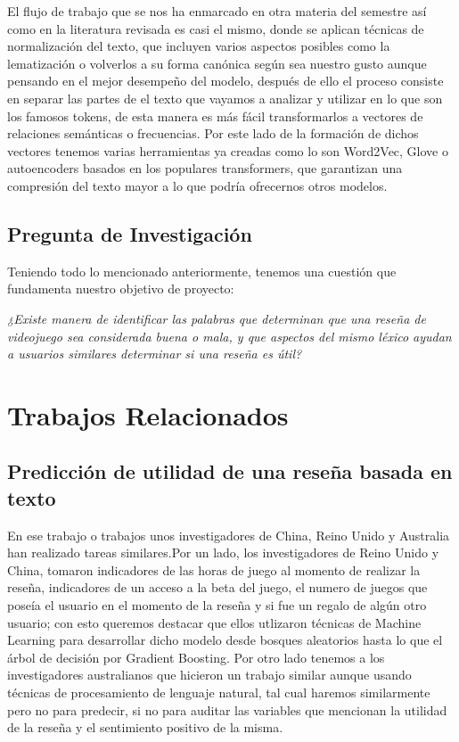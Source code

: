 \documentclass{article}
\begin{document}
El flujo de trabajo que se nos ha enmarcado en otra materia del semestre así como en la literatura revisada es casi el mismo, donde se aplican técnicas de normalización del texto, que incluyen varios aspectos posibles como la lematización o volverlos a su forma canónica según sea nuestro gusto aunque pensando en el mejor desempeño del modelo, después de ello el proceso consiste en separar las partes de el texto que vayamos a analizar y utilizar en lo que son los famosos tokens, de esta manera es más fácil transformarlos a vectores de relaciones semánticas o frecuencias. Por este lado de la formación de dichos vectores tenemos varias herramientas ya creadas como lo son Word2Vec, Glove o autoencoders basados en los populares transformers, que garantizan una compresión del texto mayor a lo que podría ofrecernos otros modelos.

\subsection{Pregunta de Investigación}
Teniendo todo lo mencionado anteriormente, tenemos una cuestión que fundamenta nuestro objetivo de proyecto:

\textit{¿Existe manera de identificar las palabras que determinan que una reseña de videojuego sea considerada buena o mala, y que aspectos del mismo léxico ayudan a usuarios similares determinar si una reseña es útil?}

\section{Trabajos Relacionados}
\subsection{Predicción de utilidad de una reseña basada en texto}
En ese trabajo o trabajos unos investigadores de China, Reino Unido y Australia han realizado tareas similares.Por un lado, los investigadores de Reino Unido y China, tomaron indicadores de las horas de juego al momento de realizar la  reseña, indicadores de un acceso a la beta del juego, el numero de juegos que poseía el usuario en el momento de la reseña y si fue un regalo de algún otro usuario; con esto queremos destacar que ellos utlizaron técnicas de Machine Learning para desarrollar dicho modelo desde bosques aleatorios hasta lo que el árbol de decisión por Gradient Boosting. Por otro lado tenemos a los investigadores australianos que hicieron un trabajo similar aunque usando técnicas de procesamiento de lenguaje natural, tal cual haremos similarmente pero no para predecir, si no para auditar las variables que mencionan la utilidad de la reseña y el sentimiento positivo de la misma.
\end{document}
